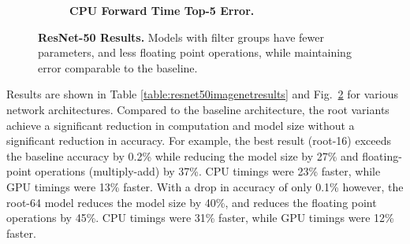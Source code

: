 \documentclass[thesis]{subfiles}
\begin{document}
\begin{figure}[tp]
\begin{subfigure}[b]{\linewidth}
			\centering
			\caption{\textbf{CPU Forward Time \vs Top-5 Error.}}
			\label{fig:resnet5050cpuforward}
		\end{subfigure}
		
		\caption{\textbf{ResNet-50 Results.} Models with filter groups have fewer parameters, and less floating point operations, while maintaining error comparable to the baseline.}
		\label{fig:resnet50plots}
	\end{figure}
	Results are shown in Table \ref{table:resnet50imagenetresults} and Fig.~\ref{fig:resnet50plots} for various network architectures. Compared to the baseline architecture, the root variants achieve a significant reduction in computation and model size without a significant reduction in accuracy. For example, the best result (root-16) exceeds the baseline accuracy by 0.2\% while reducing the model size by 27\% and floating-point operations (multiply-add) by 37\%. CPU timings were 23\% faster, while GPU timings were 13\% faster. With a drop in accuracy of only 0.1\% however, the root-64 model reduces the model size by 40\%, and reduces the floating point operations by 45\%. CPU timings were 31\% faster, while GPU timings were 12\% faster. 
	
\end{document}
